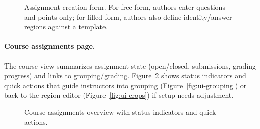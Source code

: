 \documentclass[ms,twoside,print]{nuthesis}
\begin{document}
\begin{figure}[htb]
  \centering
  \caption{Assignment creation form. For free-form, authors enter questions and points only; for filled-form, authors also define identity/answer regions against a template.}
  \label{fig:assignment-creation}
\end{figure}

\paragraph{Course assignments page.}
The course view summarizes assignment state (open/closed, submissions, grading progress) and links to grouping/grading. Figure~\ref{fig:course-page} shows status indicators and quick actions that guide instructors into grouping (Figure~\ref{fig:ui-grouping}) or back to the region editor (Figure~\ref{fig:ui-crops}) if setup needs adjustment.

\begin{figure}[htb]
  \centering
  \caption{Course assignments overview with status indicators and quick actions.}
  \label{fig:course-page}
\end{figure}
\end{document}
